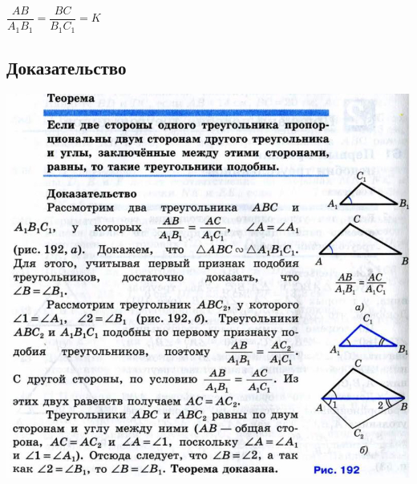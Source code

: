 \documentclass[12pt, letterpaper]{article}
\begin{document}
\begin{center}
$ \dfrac{AB}{A_1 B_1} = \dfrac{BC}{B_1 C_1} = K $ \\ 
\end{center}

\subsection{Доказательство}
\includegraphics[scale=0.3]{photo8.jpg} \\
\end{document}
